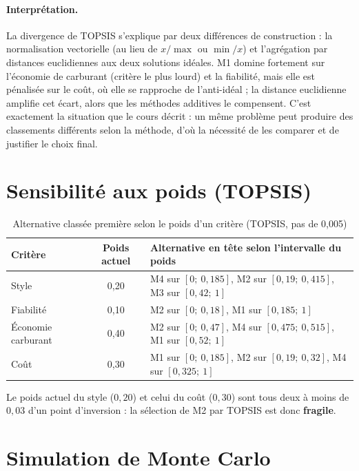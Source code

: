 \documentclass[11pt,a4paper]{report}
\theoremstyle{definition}
\theoremstyle{remark}
\begin{document}
\paragraph{Interprétation.} La divergence de TOPSIS s'explique par deux différences de construction :
la normalisation vectorielle (au lieu de $x/\max$ ou $\min/x$) et l'agrégation par distances euclidiennes
aux deux solutions idéales. M1 domine fortement sur l'économie de carburant (critère le plus lourd) et la
fiabilité, mais elle est pénalisée sur le coût, où elle se rapproche de l'anti-idéal ; la distance
euclidienne amplifie cet écart, alors que les méthodes additives le compensent. C'est exactement la
situation que le cours décrit : un même problème peut produire des classements différents selon la
méthode, d'où la nécessité de les comparer et de justifier le choix final.

\section{Sensibilité aux poids (TOPSIS)}

\begin{table}[H]
\centering
\caption{Alternative classée première selon le poids d'un critère (TOPSIS, pas de 0,005)}\label{tab:sens}
\begin{tabular}{lcl}
\toprule
\textbf{Critère} & \textbf{Poids actuel} & \textbf{Alternative en tête selon l'intervalle du poids}\\
\midrule
Style & 0,20 & M4 sur $[0;\ 0{,}185]$, M2 sur $[0{,}19;\ 0{,}415]$, M3 sur $[0{,}42;\ 1]$\\
Fiabilité & 0,10 & M2 sur $[0;\ 0{,}18]$, M1 sur $[0{,}185;\ 1]$\\
Économie carburant & 0,40 & M2 sur $[0;\ 0{,}47]$, M4 sur $[0{,}475;\ 0{,}515]$, M1 sur $[0{,}52;\ 1]$\\
Coût & 0,30 & M1 sur $[0;\ 0{,}185]$, M2 sur $[0{,}19;\ 0{,}32]$, M4 sur $[0{,}325;\ 1]$\\
\bottomrule
\end{tabular}
\end{table}

Le poids actuel du style ($0{,}20$) et celui du coût ($0{,}30$) sont tous deux à moins de $0{,}03$ d'un point
d'inversion : la sélection de M2 par TOPSIS est donc \textbf{fragile}.

\section{Simulation de Monte Carlo}
\end{document}
